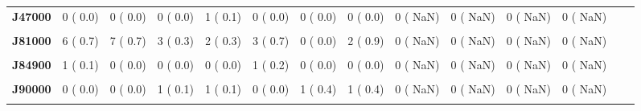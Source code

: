 \documentclass[
]{article}
\begin{document}
\begin{table}[H]
\begin{tabular}[t]{>{\raggedright\arraybackslash}p{5em}ccccccccccccc}
\textbf{J47000} & 0 (  0.0) & 0 (  0.0) & 0 (  0.0) & 1 (  0.1) & 0 (  0.0) & 0 (  0.0) & 0 (  0.0) & 0 (  NaN) & 0 (  NaN) & 0 (  NaN) & 0 (  NaN) &  & \\
\textbf{\cellcolor{gray!10}{J69000}} & \cellcolor{gray!10}{7 (  0.8)} & \cellcolor{gray!10}{6 (  0.6)} & \cellcolor{gray!10}{4 (  0.4)} & \cellcolor{gray!10}{2 (  0.3)} & \cellcolor{gray!10}{3 (  0.7)} & \cellcolor{gray!10}{2 (  0.7)} & \cellcolor{gray!10}{2 (  0.9)} & \cellcolor{gray!10}{0 (  NaN)} & \cellcolor{gray!10}{0 (  NaN)} & \cellcolor{gray!10}{0 (  NaN)} & \cellcolor{gray!10}{0 (  NaN)} & \cellcolor{gray!10}{} & \cellcolor{gray!10}{}\\
\textbf{J81000} & 6 (  0.7) & 7 (  0.7) & 3 (  0.3) & 2 (  0.3) & 3 (  0.7) & 0 (  0.0) & 2 (  0.9) & 0 (  NaN) & 0 (  NaN) & 0 (  NaN) & 0 (  NaN) &  & \\
\textbf{\cellcolor{gray!10}{J84100}} & \cellcolor{gray!10}{0 (  0.0)} & \cellcolor{gray!10}{0 (  0.0)} & \cellcolor{gray!10}{0 (  0.0)} & \cellcolor{gray!10}{1 (  0.1)} & \cellcolor{gray!10}{0 (  0.0)} & \cellcolor{gray!10}{1 (  0.4)} & \cellcolor{gray!10}{1 (  0.4)} & \cellcolor{gray!10}{0 (  NaN)} & \cellcolor{gray!10}{0 (  NaN)} & \cellcolor{gray!10}{0 (  NaN)} & \cellcolor{gray!10}{0 (  NaN)} & \cellcolor{gray!10}{} & \cellcolor{gray!10}{}\\
\textbf{J84900} & 1 (  0.1) & 0 (  0.0) & 0 (  0.0) & 0 (  0.0) & 1 (  0.2) & 0 (  0.0) & 0 (  0.0) & 0 (  NaN) & 0 (  NaN) & 0 (  NaN) & 0 (  NaN) &  & \\
\textbf{\cellcolor{gray!10}{J85000}} & \cellcolor{gray!10}{1 (  0.1)} & \cellcolor{gray!10}{0 (  0.0)} & \cellcolor{gray!10}{0 (  0.0)} & \cellcolor{gray!10}{0 (  0.0)} & \cellcolor{gray!10}{0 (  0.0)} & \cellcolor{gray!10}{0 (  0.0)} & \cellcolor{gray!10}{0 (  0.0)} & \cellcolor{gray!10}{0 (  NaN)} & \cellcolor{gray!10}{0 (  NaN)} & \cellcolor{gray!10}{0 (  NaN)} & \cellcolor{gray!10}{0 (  NaN)} & \cellcolor{gray!10}{} & \cellcolor{gray!10}{}\\
\textbf{J90000} & 0 (  0.0) & 0 (  0.0) & 1 (  0.1) & 1 (  0.1) & 0 (  0.0) & 1 (  0.4) & 1 (  0.4) & 0 (  NaN) & 0 (  NaN) & 0 (  NaN) & 0 (  NaN) &  & \\
\textbf{\cellcolor{gray!10}{J93900}} & \cellcolor{gray!10}{1 (  0.1)} & \cellcolor{gray!10}{0 (  0.0)} & \cellcolor{gray!10}{0 (  0.0)} & \cellcolor{gray!10}{0 (  0.0)} & \cellcolor{gray!10}{0 (  0.0)} & \cellcolor{gray!10}{0 (  0.0)} & \cellcolor{gray!10}{0 (  0.0)} & \cellcolor{gray!10}{0 (  NaN)} & \cellcolor{gray!10}{0 (  NaN)} & \cellcolor{gray!10}{0 (  NaN)} & \cellcolor{gray!10}{0 (  NaN)} & \cellcolor{gray!10}{} & \cellcolor{gray!10}{}\\

\end{tabular}
\end{table}
\end{document}
